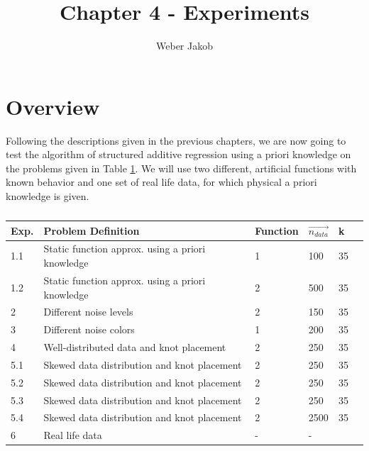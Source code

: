 \documentclass[10pt,a4paper]{article}
\title{Chapter 4 - Experiments}
\author{Weber Jakob}
\begin{document}
	\maketitle
	
\tableofcontents

\section{Overview}


Following the descriptions given in the previous chapters, we are now going to test the algorithm of structured additive regression using a priori knowledge on the problems given in Table \ref{tab:experiments}. We will use two different, artificial functions with known behavior and one set of real life data, for which physical a priori knowledge is given. 

\begin{table}[h]
	\begin{tabular}{|l|l|l|l|l|l|}
		\hline
		\textbf{Exp.} & \textbf{Problem Definition} & \textbf{Function} & \textbf{$\vec{n_{data}}$} & \textbf{k}  \\ \hline \toprule
		1.1 & Static function approx. using a priori knowledge & 1 & 100 & 35  \\ \hline
		1.2 & Static function approx. using a priori knowledge & 2 & 500 & 35  \\ \hline
		2   & Different noise levels                                 & 2 & 150 & 35  \\ \hline
		3   & Different noise colors                                 & 1 & 200 & 35  \\ \hline
		4   & Well-distributed data and knot placement               & 2 & 250 & 35  \\ \hline
		5.1 & Skewed data distribution and knot placement            & 2 & 250  & 35  \\ \hline
		5.2 & Skewed data distribution and knot placement            & 2 & 250  & 35  \\ \hline
		5.3 & Skewed data distribution and knot placement            & 2 & 250  & 35  \\ \hline
		5.4 & Skewed data distribution and knot placement            & 2 & 2500 & 35  \\ \hline
		6   & Real life data                                         & - & -   &    \\ \hline \bottomrule
	\end{tabular}
	\caption{}
	\label{tab:experiments}
\end{table}
\end{document}
